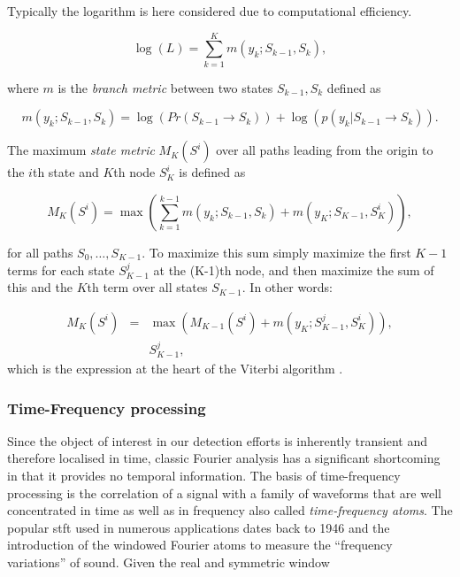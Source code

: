 Typically the \DIFdelbegin {}\DIFdelend logarithm is here considered due to computational efficiency.

\begin{equation}\label{eq:viterbiLitRev2}
\log{\left(L\right)} = \sum_{k=1}^K m(y_k ; S_{k-1}, S_{k}),
\end{equation}

where $m$ is the \emph{branch metric} between two states $S_{k-1}, S_{k}$ defined as

\begin{equation}\label{eq:viterbiLitRev3}
m(y_k ; S_{k-1}, S_{k}) = \log{\left( Pr(S_{k-1} \rightarrow S_{k}) \right)} + \log{\left( p(y_k | S_{k-1} \rightarrow S_{k}) \right)}.
\end{equation}

The maximum \emph{state metric} $M_K(S^i)$ over all paths leading from the origin to the $i$th state and $K$th node $S_K^i$ is defined as

\begin{equation}\label{eq:viterbiLitRev4}
M_K(S^i) = \max \left( \sum_{k=1}^{k-1} m(y_k ; S_{k-1}, S_{k}) + m(y_K ; S_{K-1}, S_{K}^i)\right),
\end{equation}

for all paths $S_0,\ldots, S_{K-1}$.
To maximize this sum simply maximize the first $K-1$ terms for each state $S^j_{K-1}$ at the (K-1)th node, and then maximize the sum of this and the $K$th term over all states $S_{K-1}$. In other words:

\begin{eqnarray}\label{eq:viterbiLitRev5}
M_K(S^i) &=& \max \left( M_{K-1}(S^i) + m(y_K ; S_{K-1}^j, S_{K}^i)\right), \\ \nonumber
& & S_{K-1}^j,
\end{eqnarray}
which is the expression at the heart of the Viterbi algorithm \cite{Viterbi2006}.


\subsubsection{Time-Frequency processing}
Since the object of interest in our detection efforts is inherently transient and therefore localised in time, classic Fourier analysis has a significant shortcoming in that it provides no temporal information. The basis of time-frequency processing is the correlation of a signal with a family of waveforms that are well concentrated in time as well as in frequency \cite{Mallat1999} also called \emph{time-frequency atoms}\cite{Gabor1946}. The popular \DIFdelbegin {}\DIFdelend \DIFaddbegin \gls{stft} \DIFaddend used in numerous applications dates back to 1946 and the introduction of the windowed Fourier atoms to measure the ``frequency variations'' of sound. Given the real and symmetric window


